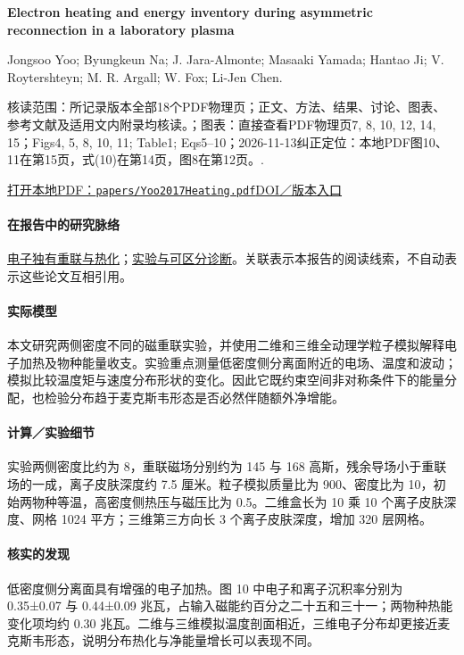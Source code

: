 \documentclass[UTF8,a4paper,11pt,openany,fontset=fandol]{ctexbook}
\begin{document}
\textbf{Electron heating and energy inventory during asymmetric reconnection in a laboratory plasma}\citep{Yoo2017Heating}\

Jongsoo Yoo;  Byungkeun Na;  J. Jara-Almonte;  Masaaki Yamada;  Hantao Ji;  V. Roytershteyn;  M. R. Argall;  W. Fox;  Li-Jen Chen.

\textsf{核读范围：}所记录版本全部18个PDF物理页；正文、方法、结果、讨论、图表、参考文献及适用文内附录均核读。；\textsf{图表：}直接查看PDF物理页7, 8, 10, 12, 14, 15；Figs4, 5, 8, 10, 11;  Table1;  Eqs5–10；2026-11-13纠正定位：本地PDF图10、11在第15页，式(10)在第14页，图8在第12页。.

\href{run:../papers/Yoo2017Heating.pdf}{打开本地PDF：\texttt{papers/Yoo2017Heating.pdf}}\quad\href{https://doi.org/10.1002/2017JA024152}{DOI／版本入口}

\paragraph{在报告中的研究脉络}\hyperref[story:energy]{电子独有重联与热化}；\hyperref[story:diagnostic]{实验与可区分诊断}。关联表示本报告的阅读线索，不自动表示这些论文互相引用。

\paragraph{实际模型}本文研究两侧密度不同的磁重联实验，并使用二维和三维全动理学粒子模拟解释电子加热及物种能量收支。实验重点测量低密度侧分离面附近的电场、温度和波动；模拟比较温度矩与速度分布形状的变化。因此它既约束空间非对称条件下的能量分配，也检验分布趋于麦克斯韦形态是否必然伴随额外净增能。

\paragraph{计算／实验细节}实验两侧密度比约为 8，重联磁场分别约为 145 与 168 高斯，残余导场小于重联场的一成，离子皮肤深度约 7.5 厘米。粒子模拟质量比为 900、密度比为 10，初始两物种等温，高密度侧热压与磁压比为 0.5。二维盒长为 10 乘 10 个离子皮肤深度、网格 1024 平方；三维第三方向长 3 个离子皮肤深度，增加 320 层网格。

\paragraph{核实的发现}低密度侧分离面具有增强的电子加热。图 10 中电子和离子沉积率分别为 0.35±0.07 与 0.44±0.09 兆瓦，占输入磁能约百分之二十五和三十一；两物种热能变化项均约 0.30 兆瓦。二维与三维模拟温度剖面相近，三维电子分布却更接近麦克斯韦形态，说明分布热化与净能量增长可以表现不同。
\end{document}
